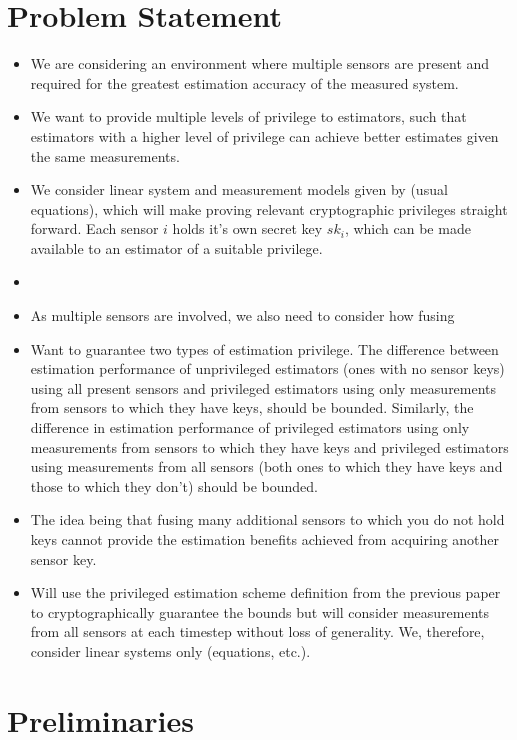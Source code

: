 \documentclass[conference]{IEEEtran}
\begin{document}
\section{Problem Statement}
\begin{itemize}
  \item We are considering an environment where multiple sensors are present and required for the greatest estimation accuracy of the measured system.
  \item We want to provide multiple levels of privilege to estimators, such that estimators with a higher level of privilege can achieve better estimates given the same measurements.
  \item We consider linear system and measurement models given by (usual equations), which will make proving relevant cryptographic privileges straight forward. Each sensor $i$ holds it's own secret key $sk_i$, which can be made available to an estimator of a suitable privilege.
  \item 
  \item As multiple sensors are involved, we also need to consider how fusing
  \item Want to guarantee two types of estimation privilege. The difference between estimation performance of unprivileged estimators (ones with no sensor keys) using all present sensors and privileged estimators using only measurements from sensors to which they have keys, should be bounded. Similarly, the difference in estimation performance of privileged estimators using only measurements from sensors to which they have keys and privileged estimators using measurements from all sensors (both ones to which they have keys and those to which they don't) should be bounded.
  \item The idea being that fusing many additional sensors to which you do not hold keys cannot provide the estimation benefits achieved from acquiring another sensor key.
  \item Will use the privileged estimation scheme definition from the previous paper to cryptographically guarantee the bounds but will consider measurements from all sensors at each timestep without loss of generality. We, therefore, consider linear systems only (equations, etc.).
\end{itemize}


\section{Preliminaries}
\end{document}
